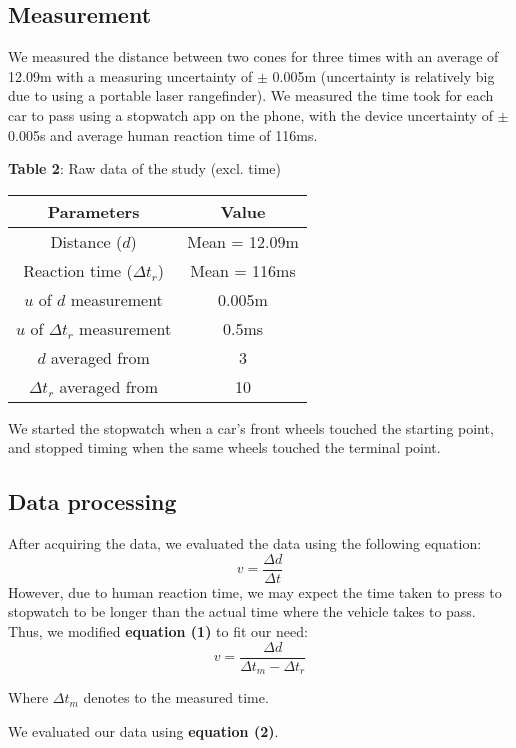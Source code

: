 \documentclass[10pt,twocolumn,letterpaper]{article}
\begin{document}
\subsection{Measurement}
We measured the distance between two cones for three times with an average of 12.09m with a measuring uncertainty of $\pm$ 0.005m (uncertainty is relatively big due to using a portable laser rangefinder). We measured the time took for each car to pass using a stopwatch app on the phone, with the device uncertainty of $\pm$ 0.005s and average human reaction time of 116ms.
\begin{center}
	\textbf{Table 2}: Raw data of the study (excl. time)\\
    \begin{tabular}{cc}
    \toprule
    Parameters &Value\\
    \midrule
    Distance ($d$) & Mean = 12.09m\\
    Reaction time  ($\Delta t_r$) & Mean = 116ms\\
    $u$ of $d$ measurement & 0.005m\\
    $u$ of $\Delta t_r$ measurement & 0.5ms\\
    $d$ averaged from  & 3\\
    $\Delta t_r$ averaged from & 10\\
    \bottomrule
    \end{tabular}
\end{center}
We started the stopwatch when a car’s front wheels touched the starting point, and stopped timing when the same wheels touched the terminal point.
\subsection{Data processing}
After acquiring the data, we evaluated the data using the following equation:
\begin{equation}
	v =\frac{\Delta d}{\Delta t}
\end{equation}
However, due to human reaction time, we may expect the time taken to press to stopwatch to be longer than the actual time where the vehicle takes to pass. Thus, we modified \textbf{equation (1)} to fit our need:
\begin{equation}
	v = \frac{\Delta d}{\Delta t_{m} - \Delta t_r}
\end{equation}
\begin{center}
	Where $\Delta t_m$ denotes to the measured time.
\end{center}
We evaluated our data  using \textbf{equation (2)}. 
 
\end{document}
